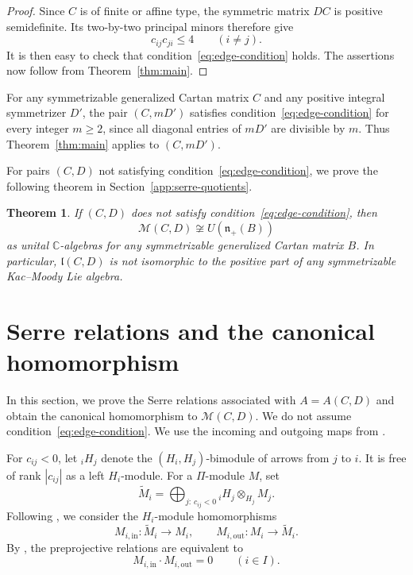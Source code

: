 \documentclass[12pt,reqno]{amsart}
\numberwithin{equation}{section}
\newtheorem{theorem}{Theorem}[section]
\theoremstyle{definition}
\theoremstyle{remark}
\newcommand{\M}{\mathcal M}
\theoremstyle{plain}
\theoremstyle{plain}
\begin{document}
\begin{proof}
Since $C$ is of finite or affine type, the symmetric matrix $DC$ is positive semidefinite. Its two-by-two principal minors therefore
give
\[
    c_{ij}c_{ji}\leq 4
    \qquad (i\neq j).
\]
It is then easy to check that condition~\eqref{eq:edge-condition} holds. The assertions now follow from Theorem~\ref{thm:main}.
\end{proof}

For any symmetrizable generalized Cartan matrix $C$ and any positive integral symmetrizer $D'$, the pair $(C,mD')$ satisfies condition~\eqref{eq:edge-condition} for every integer $m\ge 2$, since all diagonal entries of $mD'$ are divisible by $m$. Thus Theorem~\ref{thm:main} applies to $(C,mD')$.

For pairs $(C,D)$ not satisfying condition~\eqref{eq:edge-condition}, we prove the following theorem in Section~\ref{app:serre-quotients}.

\begin{theorem}\label{thm:nonrealization}
   If $(C,D)$ does not satisfy condition~\eqref{eq:edge-condition}, then
\[
    \mathcal M(C,D)\not\cong U(\mathfrak n_+(B))
\]
as unital $\mathbb C$-algebras for any symmetrizable generalized Cartan matrix $B$. In particular, $\mathfrak l(C,D)$ is not isomorphic to the positive part of any symmetrizable Kac--Moody Lie algebra. 
\end{theorem}



\section{Serre relations and the canonical homomorphism} \label{sec:surjectivity}
In this section, we prove the Serre relations associated with $A=A(C,D)$ and obtain the canonical homomorphism to $\M(C,D)$. We do not assume condition~\eqref{eq:edge-condition}.
We use the incoming and outgoing maps from \cite[Sections~5.1--5.3]{GLS17}. 

For $c_{ij}<0$, let ${}_iH_j$ denote the $(H_i,H_j)$-bimodule of arrows from $j$ to $i$. It is free of rank $|c_{ij}|$ as a left $H_i$-module. For a $\Pi$-module $M$, set
\[
    \widetilde M_i
    =
    \bigoplus_{j:\,c_{ij}<0}
    {}_iH_j\otimes_{H_j}M_j.
\]
Following \cite[Section~5.3]{GLS17}, we consider the $H_i$-module homomorphisms
\[
    M_{i,\mathrm{in}}\colon\widetilde M_i\longrightarrow M_i,
    \qquad
    M_{i,\mathrm{out}}\colon M_i\longrightarrow\widetilde M_i.
\]
By \cite[Proposition~5.2]{GLS17}, the preprojective relations are equivalent to
\[
    M_{i,\mathrm{in}}\cdot M_{i,\mathrm{out}}=0
    \qquad(i\in I).
\]
\end{document}
